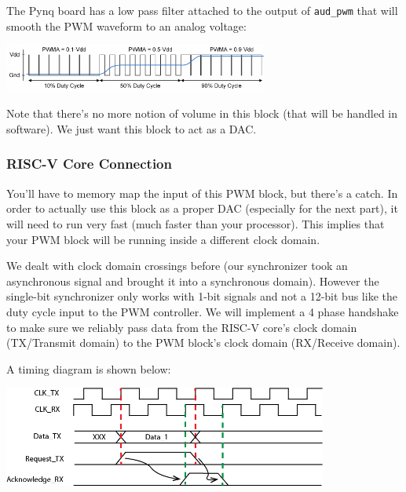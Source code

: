 \documentclass[11pt]{article}
\begin{document}
The Pynq board has a low pass filter attached to the output of \verb|aud_pwm| that will smooth the PWM waveform to an analog voltage:
\begin{center}
  \includegraphics[width=0.65\textwidth]{images/pynq-z1-audio-pwm.png}
\end{center}

Note that there's no more notion of volume in this block (that will be handled in software).
We just want this block to act as a DAC.

\subsubsection{RISC-V Core Connection}
You'll have to memory map the input of this PWM block, but there's a catch.
In order to actually use this block as a proper DAC (especially for the next part), it will need to run very fast (much faster than your processor).
This implies that your PWM block will be running inside a different clock domain.

We dealt with clock domain crossings before (our synchronizer took an asynchronous signal and brought it into a synchronous domain).
However the single-bit synchronizer only works with 1-bit signals and not a 12-bit bus like the duty cycle input to the PWM controller.
We will implement a 4 phase handshake to make sure we reliably pass data from the RISC-V core's clock domain (TX/Transmit domain) to the PWM block's clock domain (RX/Receive domain).

A timing diagram is shown below:
\begin{center}
  \includegraphics[width=0.8\textwidth]{images/ss_r_ack.png}
\end{center}
\end{document}
